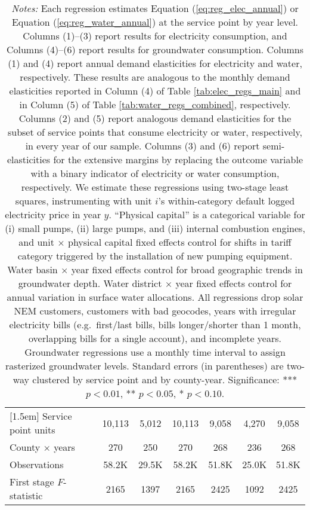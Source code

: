 \begin{table}[t!]
\begin{adjustbox}{center}
\begin{tabular}{lcccccc}
[1.5em] 
Service point units & 10,113 & 5,012 & 10,113 & 9,058 & 4,270 & 9,058  \\ 
[0.1em] 
County $\times$ years  & 270 & 250 & 270 & 268 & 236 & 268 \\ 
[0.1em] 
Observations & 58.2K & 29.5K & 58.2K & 51.8K & 25.0K & 51.8K \\ 
[0.1em] 
First stage $F$-statistic & 2165 & 1397 & 2165 & 2425 & 1092 & 2425 \\ 
[0.15em]
\hline
\end{tabular}
\end{adjustbox}
\captionsetup{width=\textwidth}
\caption*{\scriptsize \emph{Notes:} Each regression estimates Equation (\ref{eq:reg_elec_annual}) or Equation (\ref{eq:reg_water_annual}) at the service point by year level.
Columns (1)--(3) report results for electricity consumption, and Columns (4)--(6) report results for groundwater consumption.
Columns (1) and (4) report annual demand elasticities for electricity and water, respectively. These results are analogous to the monthly demand elasticities reported 
in Column (4) of Table \ref{tab:elec_regs_main} and in Column (5) of Table \ref{tab:water_regs_combined}, respectively.
Columns (2) and (5) report analogous demand elasticities for the subset of service points that consume electricity or water, respectively, in every year of our sample.
Columns (3) and (6) report semi-elasticities for the extensive margins by replacing the outcome variable with a binary indicator of electricity or water consumption, respectively.
We estimate these regressions using two-stage least squares, instrumenting with unit $i$'s within-category default logged electricity price in year $y$.
``Physical capital'' is a categorical variable for (i) small pumps, (ii) large pumps, and (iii) internal combustion engines, and unit $\times$
physical capital fixed effects control for shifts in tariff category triggered by the installation of new pumping equipment.
Water basin $\times$ year fixed effects control for broad geographic trends in groundwater depth.
Water district $\times$ year fixed effects control for annual variation in surface water allocations.
All regressions drop solar NEM customers, customers with bad geocodes, years with irregular electricity bills
(e.g.\ first/last bills, bills longer/shorter than 1 month, overlapping bills for a single account), and incomplete years.
Groundwater regressions use a monthly time interval to assign rasterized groundwater levels.
Standard errors (in parentheses) are two-way clustered by service point and by county-year.
Significance: *** $p < 0.01$, ** $p < 0.05$, * $p < 0.10$.
}
\end{table}
